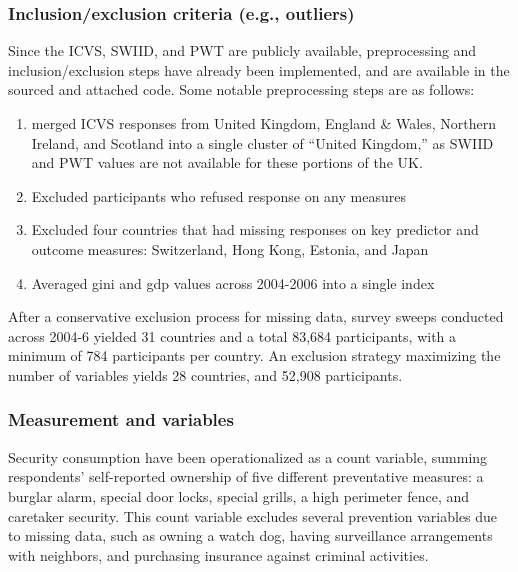 \documentclass[
  english,
  man]{apa6}
\begin{document}
\hypertarget{inclusionexclusion-criteria-e.g.-outliers}{%
\subsubsection{Inclusion/exclusion criteria (e.g., outliers)}\label{inclusionexclusion-criteria-e.g.-outliers}}

Since the ICVS, SWIID, and PWT are publicly available, preprocessing and inclusion/exclusion steps have already been implemented, and are available in the sourced and attached code. Some notable preprocessing steps are as follows:

\begin{enumerate}
\def\labelenumi{\arabic{enumi}.}
\item
  merged ICVS responses from United Kingdom, England \& Wales, Northern Ireland, and Scotland into a single cluster of ``United Kingdom,'' as SWIID and PWT values are not available for these portions of the UK.
\item
  Excluded participants who refused response on any measures
\item
  Excluded four countries that had missing responses on key predictor and outcome measures: Switzerland, Hong Kong, Estonia, and Japan
\item
  Averaged gini and gdp values across 2004-2006 into a single index
\end{enumerate}

After a conservative exclusion process for missing data, survey sweeps conducted across 2004-6 yielded 31 countries and a total 83,684 participants, with a minimum of 784 participants per country. An exclusion strategy maximizing the number of variables yields 28 countries, and 52,908 participants.

\hypertarget{measurement-and-variables}{%
\subsubsection{Measurement and variables}\label{measurement-and-variables}}

Security consumption have been operationalized as a count variable, summing respondents' self-reported ownership of five different preventative measures: a burglar alarm, special door locks, special grills, a high perimeter fence, and caretaker security. This count variable excludes several prevention variables due to missing data, such as owning a watch dog, having surveillance arrangements with neighbors, and purchasing insurance against criminal activities.
\end{document}
